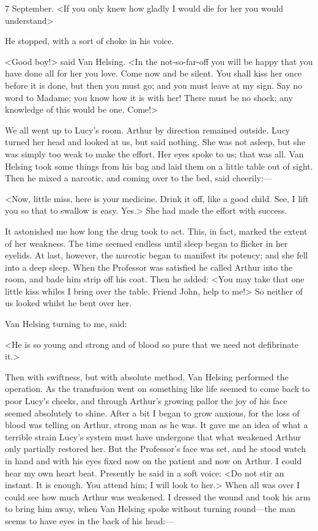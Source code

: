 \begin{diary}{7 September.}
<If you only knew how gladly I would die for her you would understand\longdash>

He stopped, with a sort of choke in his voice.

<Good boy!> said Van Helsing. <In the not-so-far-off you will be happy that you have done all for her you love. Come now and be silent. You shall kiss her once before it is done, but then you must go; and you must leave at my sign. Say no word to Madame; you know how it is with her! There must be no shock; any knowledge of this would be one. Come!>

We all went up to Lucy's room. Arthur by direction remained outside. Lucy turned her head and looked at us, but said nothing. She was not asleep, but she was simply too weak to make the effort. Her eyes spoke to us; that was all. Van Helsing took some things from his bag and laid them on a little table out of sight. Then he mixed a narcotic, and coming over to the bed, said cheerily:—

<Now, little miss, here is your medicine. Drink it off, like a good child. See, I lift you so that to swallow is easy. Yes.> She had made the effort with success.

It astonished me how long the drug took to act. This, in fact, marked the extent of her weakness. The time seemed endless until sleep began to flicker in her eyelids. At last, however, the narcotic began to manifest its potency; and she fell into a deep sleep. When the Professor was satisfied he called Arthur into the room, and bade him strip off his coat. Then he added: <You may take that one little kiss whiles I bring over the table. Friend John, help to me!> So neither of us looked whilst he bent over her.

Van Helsing turning to me, said:

<He is so young and strong and of blood so pure that we need not defibrinate it.>

Then with swiftness, but with absolute method, Van Helsing performed the operation. As the transfusion went on something like life seemed to come back to poor Lucy's cheeks, and through Arthur's growing pallor the joy of his face seemed absolutely to shine. After a bit I began to grow anxious, for the loss of blood was telling on Arthur, strong man as he was. It gave me an idea of what a terrible strain Lucy's system must have undergone that what weakened Arthur only partially restored her. But the Professor's face was set, and he stood watch in hand and with his eyes fixed now on the patient and now on Arthur. I could hear my own heart beat. Presently he said in a soft voice: <Do not stir an instant. It is enough. You attend him; I will look to her.> When all was over I could see how much Arthur was weakened. I dressed the wound and took his arm to bring him away, when Van Helsing spoke without turning round—the man seems to have eyes in the back of his head:—


\end{diary}
